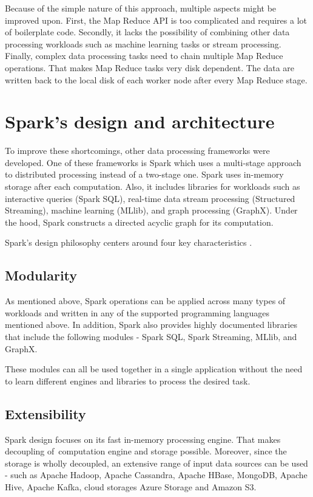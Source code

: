 Because of the simple nature of this approach, multiple aspects might be improved upon. First, the Map Reduce API is too complicated and requires a lot of boilerplate code. Secondly,  it lacks the possibility of combining other data processing workloads such as machine learning tasks or stream processing. Finally, complex data processing tasks need to chain multiple Map Reduce operations. That makes Map Reduce tasks very disk dependent. The data are written back to the local disk of each worker node after every Map Reduce stage.





\section{Spark's design and architecture}

To improve these shortcomings, other data processing frameworks were developed. One of these frameworks is Spark which uses a multi-stage approach to distributed processing instead of a two-stage one. Spark uses in-memory storage after each computation. Also, it includes libraries for workloads such as interactive queries (Spark SQL), real-time data stream processing (Structured Streaming), machine learning (MLlib), and graph processing (GraphX).  Under the hood, Spark constructs a directed acyclic graph for its computation. 

Spark's design philosophy centers around four key characteristics \cite{LearningSpark}.


\subsection*{Modularity}


As mentioned above, Spark operations can be applied across many types of workloads and written in any of the supported programming languages mentioned above. In addition, Spark also provides highly documented libraries that include the following modules - Spark SQL, Spark Streaming, MLlib, and GraphX. 

These modules can all be used together in a single application without the need to learn different engines and libraries to process the desired task.


\subsection*{Extensibility}

Spark design focuses on its fast in-memory processing engine. That makes decoupling of~computation engine and storage possible. Moreover, since the storage is wholly decoupled, an extensive range of input data sources can be used - such as Apache Hadoop, Apache Cassandra, Apache HBase, MongoDB, Apache Hive, Apache Kafka, cloud storages Azure Storage and Amazon S3. 

